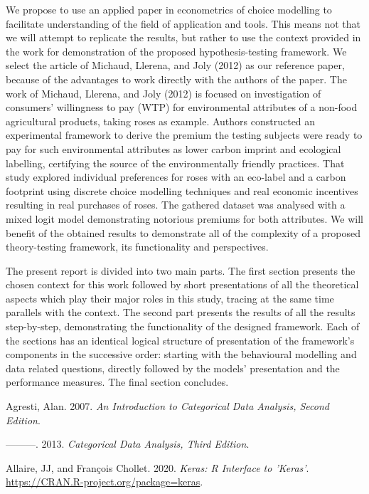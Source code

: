 \documentclass[12pt,]{article}
\begin{document}
We propose to use an applied paper in econometrics of choice modelling
to facilitate understanding of the field of application and tools. This
means not that we will attempt to replicate the results, but rather to
use the context provided in the work for demonstration of the proposed
hypothesis-testing framework. We select the article of Michaud, Llerena,
and Joly (2012) as our reference paper, because of the advantages to
work directly with the authors of the paper. The work of Michaud,
Llerena, and Joly (2012) is focused on investigation of consumers'
willingness to pay (WTP) for environmental attributes of a non-food
agricultural products, taking roses as example. Authors constructed an
experimental framework to derive the premium the testing subjects were
ready to pay for such environmental attributes as lower carbon imprint
and ecological labelling, certifying the source of the environmentally
friendly practices. That study explored individual preferences for roses
with an eco-label and a carbon footprint using discrete choice modelling
techniques and real economic incentives resulting in real purchases of
roses. The gathered dataset was analysed with a mixed logit model
demonstrating notorious premiums for both attributes. We will benefit of
the obtained results to demonstrate all of the complexity of a proposed
theory-testing framework, its functionality and perspectives.

The present report is divided into two main parts. The first section
presents the chosen context for this work followed by short
presentations of all the theoretical aspects which play their major
roles in this study, tracing at the same time parallels with the
context. The second part presents the results of all the results
step-by-step, demonstrating the functionality of the designed framework.
Each of the sections has an identical logical structure of presentation
of the framework's components in the successive order: starting with the
behavioural modelling and data related questions, directly followed by
the models' presentation and the performance measures. The final section
concludes.

\newpage

\hypertarget{refs}{}
\leavevmode\hypertarget{ref-agresti2007cd}{}%
Agresti, Alan. 2007. \emph{An Introduction to Categorical Data Analysis,
Second Edition}.

\leavevmode\hypertarget{ref-agresti2013cd}{}%
---------. 2013. \emph{Categorical Data Analysis, Third Edition}.

\leavevmode\hypertarget{ref-R-keras}{}%
Allaire, JJ, and François Chollet. 2020. \emph{Keras: R Interface to
'Keras'}. \url{https://CRAN.R-project.org/package=keras}.
\end{document}
